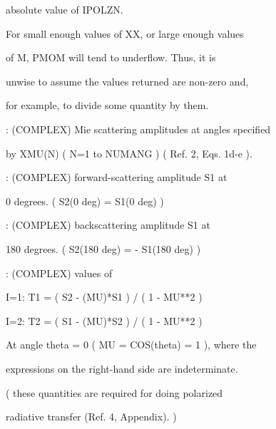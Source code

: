 \documentclass[letterpaper,10pt,english]{sphinxmanual}
\begin{document}
\begin{fulllineitems}
\begin{DUlineblock}{0em}
\begin{DUlineblock}{\DUlineblockindent}
\item[] absolute value of IPOLZN.
\item[] For small enough values of XX, or large enough values
\item[] of M,  PMOM  will tend to underflow.  Thus, it is
\item[] unwise to assume the values returned are non-zero and,
\item[] for example, to divide some quantity by them.
\end{DUlineblock}
\item[] :  (COMPLEX) Mie scattering amplitudes at angles specified
\item[]
\begin{DUlineblock}{\DUlineblockindent}
\item[] by XMU(N) ( N=1 to NUMANG )  ( Ref. 2, Eqs. 1d-e ).
\end{DUlineblock}
\item[] :  (COMPLEX) forward-scattering amplitude S1 at
\item[]
\begin{DUlineblock}{\DUlineblockindent}
\item[] 0 degrees.  ( S2(0 deg) = S1(0 deg) )
\end{DUlineblock}
\item[] :  (COMPLEX) backscattering amplitude S1 at
\item[]
\begin{DUlineblock}{\DUlineblockindent}
\item[] 180 degrees.   ( S2(180 deg) = - S1(180 deg) )
\end{DUlineblock}
\item[] :   (COMPLEX) values of
\item[]
\begin{DUlineblock}{\DUlineblockindent}
\item[] I=1:  T1 = ( S2 - (MU)*S1 ) / ( 1 - MU**2 )
\item[] I=2:  T2 = ( S1 - (MU)*S2 ) / ( 1 - MU**2 )
\item[] At angle theta = 0 ( MU = COS(theta) = 1 ), where the
\item[] expressions on the right-hand side are indeterminate.
\item[] ( these quantities are required for doing polarized
\item[] radiative transfer (Ref. 4, Appendix). )
\end{DUlineblock}

\end{DUlineblock}
\end{fulllineitems}
\end{document}
